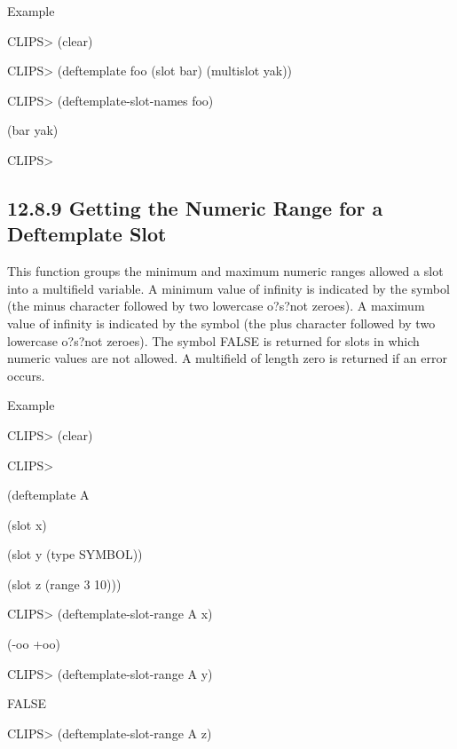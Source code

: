 \documentclass[letterpaper,10pt,english]{sphinxmanual}
\begin{document}
Example

CLIPS\textgreater{} (clear)

CLIPS\textgreater{} (deftemplate foo (slot bar) (multislot yak))

CLIPS\textgreater{} (deftemplate-slot-names foo)

(bar yak)

CLIPS\textgreater{}


\subsection{12.8.9 Getting the Numeric Range for a Deftemplate Slot}
\label{\detokenize{actions:getting-the-numeric-range-for-a-deftemplate-slot}}
This function groups the minimum and maximum numeric ranges allowed a
slot into a multifield variable. A minimum value of infinity is
indicated by the symbol  (the minus character followed by two
lowercase o?s?not zeroes). A maximum value of infinity is indicated by
the symbol  (the plus character followed by two lowercase o?s?not
zeroes). The symbol FALSE is returned for slots in which numeric values
are not allowed. A multifield of length zero is returned if an error
occurs.


\begin{sphinxVerbatim}[commandchars=\\\{\}]
  
\end{sphinxVerbatim}

Example

CLIPS\textgreater{} (clear)

CLIPS\textgreater{}

(deftemplate A

(slot x)

(slot y (type SYMBOL))

(slot z (range 3 10)))

CLIPS\textgreater{} (deftemplate-slot-range A x)

(-oo +oo)

CLIPS\textgreater{} (deftemplate-slot-range A y)

FALSE

CLIPS\textgreater{} (deftemplate-slot-range A z)
\end{document}
